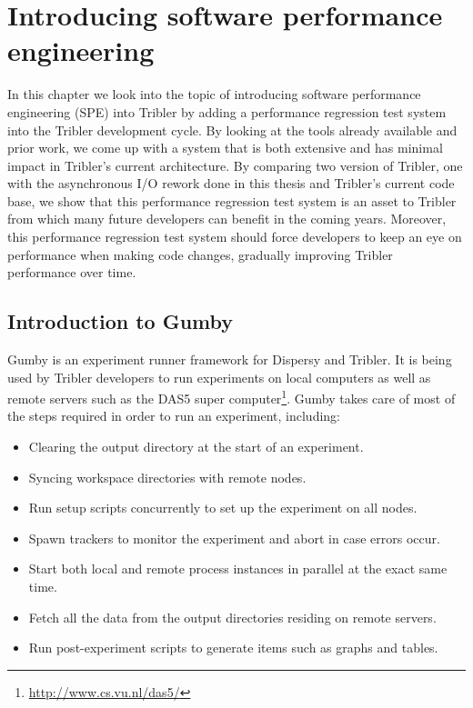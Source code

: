 \chapter{Introducing software performance engineering}

In this chapter we look into the topic of introducing software performance engineering (SPE) into Tribler by adding a performance regression test system into the Tribler development cycle.
By looking at the tools already available and prior work, we come up with a system that is both extensive and has minimal impact in Tribler's current architecture.
By comparing two version of Tribler, one with the asynchronous I/O rework done in this thesis and Tribler's current code base, we show that this performance regression test system is an asset to Tribler from which many future developers can benefit in the coming years.
Moreover, this performance regression test system should force developers to keep an eye on performance when making code changes, gradually improving Tribler performance over time.

\section{Introduction to Gumby}
\label{sct:gumby_introduction}

Gumby is an experiment runner framework for Dispersy and Tribler.
It is being used by Tribler developers to run experiments on local computers as well as remote servers such as the DAS5 super computer\footnote{\url{http://www.cs.vu.nl/das5/}}.
Gumby takes care of most of the steps required in order to run an experiment, including:

\begin{itemize}
	\item Clearing the output directory at the start of an experiment.
	\item Syncing workspace directories with remote nodes.
	\item Run setup scripts concurrently to set up the experiment on all nodes.
	\item Spawn trackers to monitor the experiment and abort in case errors occur.
	\item Start both local and remote process instances in parallel at the exact same time.
	\item Fetch all the data from the output directories residing on remote servers.
	\item Run post-experiment scripts to generate items such as graphs and tables.
\end{itemize}

